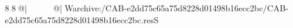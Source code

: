 8  8  @|                                                   @| W   archive:/CAB-e2dd75c65a75d8228d01498b16ecc2bc/CAB-e2dd75c65a75d8228d01498b16ecc2bc.resS 